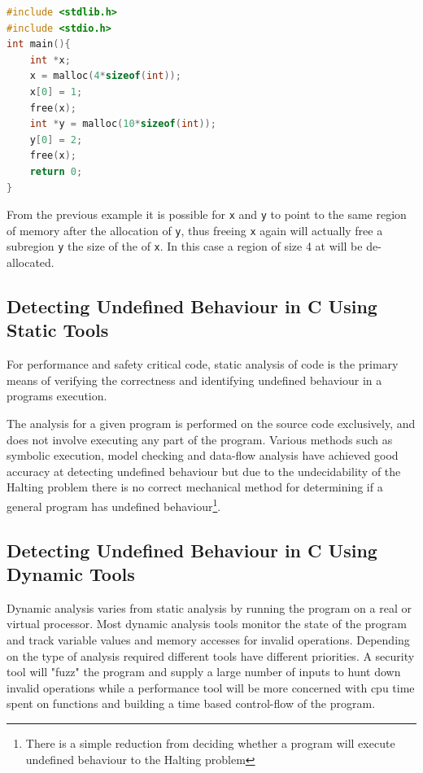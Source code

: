\begin{lstlisting}[language=C, caption=Double free, label={code:double-free}]
#include <stdlib.h>
#include <stdio.h>
int main(){
    int *x;
    x = malloc(4*sizeof(int));
    x[0] = 1;
    free(x);
    int *y = malloc(10*sizeof(int));
    y[0] = 2;
    free(x);
    return 0;
}
\end{lstlisting}

From the previous example it is possible for \texttt{x} and \texttt{y} to point to the same region of memory after the allocation of \texttt{y}, thus freeing \texttt{x} again will actually free a subregion \texttt{y} the size of the of \texttt{x}. In this case a region of size 4 at will be de-allocated.

\subsection{Detecting Undefined Behaviour in C Using Static Tools}
For performance and safety critical code, static analysis of code is the primary means of verifying the correctness and identifying undefined behaviour in a programs execution\cite{jourdan2015formally}.

The analysis for a given program is performed on the source code exclusively, and does not involve executing any part of the program. Various methods such as symbolic execution, model checking and data-flow analysis have achieved good accuracy at detecting undefined behaviour but due to the undecidability of the Halting problem there is no correct mechanical method for determining if a general program has undefined behaviour\footnote{There is a simple reduction from deciding whether a program will execute undefined behaviour to the Halting problem}.  

\subsection{Detecting Undefined Behaviour in C Using Dynamic Tools}
Dynamic analysis varies from static analysis by running the program on a real or virtual processor. Most dynamic analysis tools monitor the state of the program and track variable values and memory accesses for invalid operations. Depending on the type of analysis required different tools have different priorities. A security tool will "fuzz" the program and supply a large number of inputs to hunt down invalid operations while a performance tool will be more concerned with cpu time spent on functions and building a time based control-flow of the program. 

